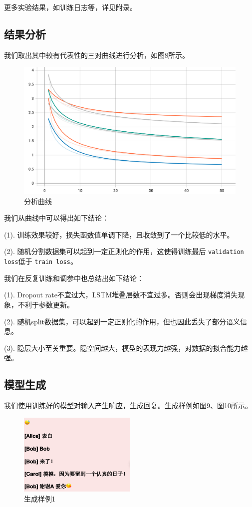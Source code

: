 \documentclass[12pt,a4paper]{article}
\begin{document}
更多实验结果，如训练日志等，详见附录。

\subsection{结果分析}
我们取出其中较有代表性的三对曲线进行分析，如图8所示。

\begin{figure}[!h]
        \centering
        \includegraphics[width=1\textwidth]{图片10.png}
        \caption{分析曲线}
\end{figure}

我们从曲线中可以得出如下结论：

(1). 训练效果较好，损失函数值单调下降，且收敛到了一个比较低的水平。

(2). 随机分割数据集可以起到一定正则化的作用，这使得训练最后 \verb|validation loss|低于 \verb|train loss|。

我们在反复训练和调参中也总结出如下结论：

(1). Dropout rate不宜过大，LSTM堆叠层数不宜过多。否则会出现梯度消失现象，不利于参数更新。

(2). 随机split数据集，可以起到一定正则化的作用，但也因此丢失了部分语义信息。

(3). 隐层大小至关重要。隐空间越大，模型的表现力越强，对数据的拟合能力越强。

\subsection{模型生成}

我们使用训练好的模型对输入产生响应，生成回复。生成样例如图9、图10所示。

\begin{figure}[!h]
        \centering
        \includegraphics[width=0.5\textwidth]{回复1.png}
        \caption{生成样例1}
\end{figure}
\end{document}
